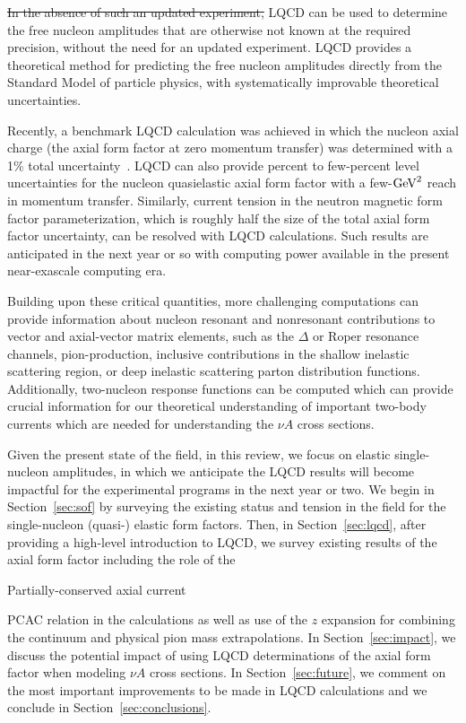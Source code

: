 \documentclass{ar-1col}
\newcommand{\change}[1]{{\color{red} #1}}
\begin{document}
\sout{In the absence of such an updated experiment,}
\change{LQCD can be used to determine the}
free nucleon amplitudes
that are otherwise not known at the required precision, \change{without the need for an updated experiment}.
LQCD provides a theoretical \change{method} %
for predicting the free nucleon amplitudes directly from the Standard Model of particle physics, with systematically improvable theoretical uncertainties.%
\begin{marginnote}
\end{marginnote}%
Recently, a benchmark LQCD calculation was achieved in which the nucleon axial charge (the axial form factor at zero momentum transfer) was determined with a 1\% total uncertainty~\cite{Chang:2018uxx}.
LQCD can also provide percent to few-percent level uncertainties for the nucleon quasielastic axial form factor with a few-${\rm GeV}^2$ reach in momentum transfer.
Similarly, current tension in the neutron magnetic form factor parameterization, which is roughly half the size of the total axial form factor uncertainty, can be resolved with LQCD calculations.
Such results are anticipated in the next year or so with computing power available in the present near-exascale computing era.

Building upon these critical quantities, more challenging computations can provide information about nucleon
resonant and nonresonant contributions to vector and axial-vector matrix elements,
such as the $\Delta$ or Roper resonance channels, pion-production,
inclusive contributions in the shallow inelastic scattering region,
or deep inelastic scattering parton distribution functions.
Additionally, two-nucleon response functions can be computed which can provide crucial information for our theoretical understanding of important two-body currents which are needed for understanding the $\nu A$ cross sections.


Given the present state of the field, in this review, we focus on elastic single-nucleon amplitudes, in which we anticipate the LQCD results will become impactful for the experimental programs in the next year or two.
We begin in Section~\ref{sec:sof} by surveying the existing status and tension in the field for the single-nucleon (quasi-) elastic form factors.
Then, in Section~\ref{sec:lqcd}, after providing a high-level introduction to LQCD, we survey existing results of the axial form factor including the role of the%
\begin{marginnote}
  {Partially-conserved} axial current
\end{marginnote}%
PCAC relation in the calculations as well as use of the $z$ expansion for combining the continuum and physical pion mass extrapolations.
In Section~\ref{sec:impact}, we discuss the potential impact of using LQCD determinations of the axial form factor when modeling $\nu A$ cross sections.
In Section~\ref{sec:future}, we comment on the most important improvements to be made in LQCD calculations and we conclude in Section~\ref{sec:conclusions}.
\end{document}
